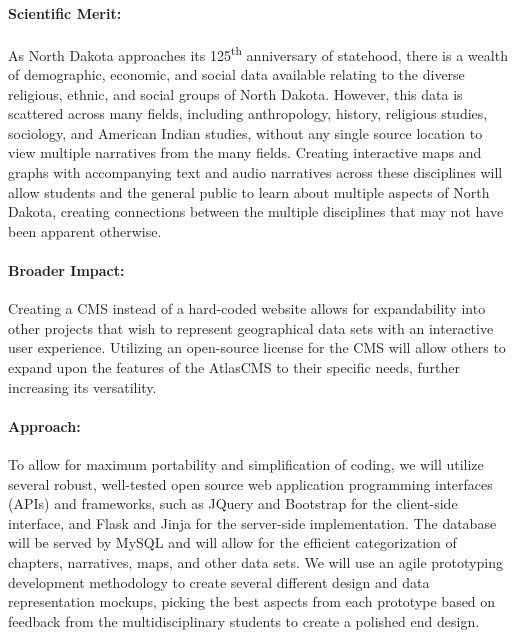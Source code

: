 \documentclass[12pt]{article}
\begin{document}
\paragraph{Scientific Merit:} \hspace{-5mm} As North Dakota approaches its 125\textsuperscript{th} anniversary of statehood, there is a wealth of demographic, economic, and social data available relating to the diverse religious, ethnic, and social groups of North Dakota. However, this data is scattered across many fields, including anthropology, history, religious studies, sociology, and American Indian studies, without any single source location to view multiple narratives from the many fields. Creating interactive maps and graphs with accompanying text and audio narratives across these disciplines will allow students and the general public to learn about multiple aspects of North Dakota, creating connections between the multiple disciplines that may not have been apparent otherwise.

\paragraph{Broader Impact:} \hspace{-5mm} Creating a CMS instead of a hard-coded website allows for expandability into other projects that wish to represent geographical data sets with an interactive user experience. Utilizing an open-source license for the CMS will allow others to expand upon the features of the AtlasCMS to their specific needs, further increasing its versatility.

\paragraph{Approach:} \hspace{-5mm} To allow for maximum portability and simplification of coding, we will utilize several robust, well-tested open source web application programming interfaces (APIs) and frameworks, such as JQuery and Bootstrap for the client-side interface, and Flask and Jinja for the server-side implementation. The database will be served by MySQL and will allow for the efficient categorization of chapters, narratives, maps, and other data sets. We will use an agile prototyping development methodology to create several different design and data representation mockups, picking the best aspects from each prototype based on feedback from the multidisciplinary students to create a polished end design.
\end{document}
